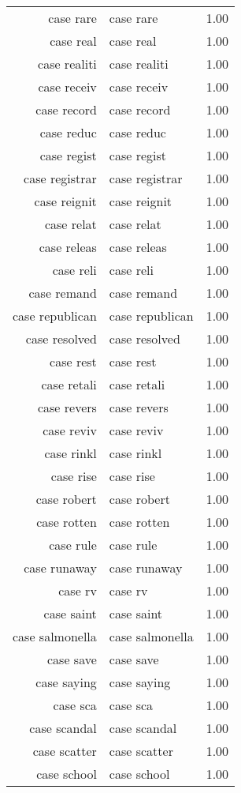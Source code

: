 \begin{table}[ht]
\begin{tabular}{rlr}
  case rare & case rare & 1.00 \\ 
  case real & case real & 1.00 \\ 
  case realiti & case realiti & 1.00 \\ 
  case receiv & case receiv & 1.00 \\ 
  case record & case record & 1.00 \\ 
  case reduc & case reduc & 1.00 \\ 
  case regist & case regist & 1.00 \\ 
  case registrar & case registrar & 1.00 \\ 
  case reignit & case reignit & 1.00 \\ 
  case relat & case relat & 1.00 \\ 
  case releas & case releas & 1.00 \\ 
  case reli & case reli & 1.00 \\ 
  case remand & case remand & 1.00 \\ 
  case republican & case republican & 1.00 \\ 
  case resolved & case resolved & 1.00 \\ 
  case rest & case rest & 1.00 \\ 
  case retali & case retali & 1.00 \\ 
  case revers & case revers & 1.00 \\ 
  case reviv & case reviv & 1.00 \\ 
  case rinkl & case rinkl & 1.00 \\ 
  case rise & case rise & 1.00 \\ 
  case robert & case robert & 1.00 \\ 
  case rotten & case rotten & 1.00 \\ 
  case rule & case rule & 1.00 \\ 
  case runaway & case runaway & 1.00 \\ 
  case rv & case rv & 1.00 \\ 
  case saint & case saint & 1.00 \\ 
  case salmonella & case salmonella & 1.00 \\ 
  case save & case save & 1.00 \\ 
  case saying & case saying & 1.00 \\ 
  case sca & case sca & 1.00 \\ 
  case scandal & case scandal & 1.00 \\ 
  case scatter & case scatter & 1.00 \\ 
  case school & case school & 1.00 \\ 

\end{tabular}
\end{table}
